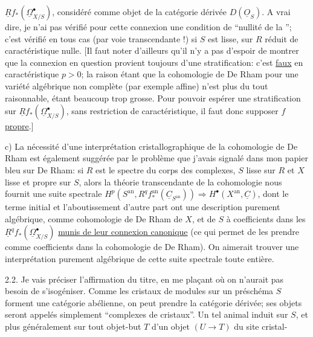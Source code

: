 $\underline{R}f_*(\underline{\Omega}^{\bullet}_{X/S})$, considéré comme objet de la catégorie dérivée $D(\underline{O}_S)$. A vrai dire, je n'ai pas vérifié pour cette connexion une condition de ``nullité de la  ''; c'est  vérifié en tous cas (par voie transcendante !) si $S$ est lisse, sur $R$ réduit de caractéristique nulle. [Il faut noter d'ailleurs qu'il n'y a pas d'espoir de montrer que la connexion en question provient toujours d'une stratification: c'est \uline{faux} en caractéristique $p>0$; la raison étant que la cohomologie de De Rham pour une variété algébrique non complète (par exemple affine) n'est plus du tout raisonnable, étant beaucoup trop grosse. Pour pouvoir espérer une stratification sur $\underline{R}f_*(\underline{\Omega}^{\bullet}_{X/S})$, sans restriction de caractéristique, il faut donc supposer $f$ \uline{propre}.]

c) La nécessité d'une interprétation cristallographique de la cohomologie de De Rham est également suggérée par le problème que j'avais signalé dans mon papier bleu sur De Rham: si $R$ est le spectre du corps des complexes, $S$ lisse sur $R$ et $X$ lisse et propre sur $S$, alors la théorie transcendante de la cohomologie nous fournit une suite spectrale $H^p(S^{\mathrm{an}},R^qf^{\mathrm{an}}_*(\underline{C}_{S^{\mathrm{an}}}))\Longrightarrow H^{\bullet}(X^{\mathrm{an}},\underline{C})$, dont le terme initial et l'aboutissement d'autre part ont une description purement algébrique, comme cohomologie de De Rham de $X$, et de $S$ à coefficients dans les $\underline{R}^qf_*(\underline{\Omega}^{\bullet}_{X/S})$ \uline{munis de leur connexion canonique}  (ce qui permet de les prendre comme coefficients dans la cohomologie de De Rham). On aimerait trouver une interprétation purement algébrique de cette suite spectrale toute entière.

2.2. Je vais préciser  l'affirmation du titre, en me plaçant  où on n'aurait pas besoin de s'isogéniser.
Comme les cristaux de modules sur un préschéma $S$ forment une catégorie abélienne, on peut prendre la catégorie dérivée; ses objets seront appelés simplement ``complexes de cristaux''. Un tel animal induit sur $S$, et plus généralement sur tout objet-but $T$ d'un objet $(U\longrightarrow T)$ du site cristal-
